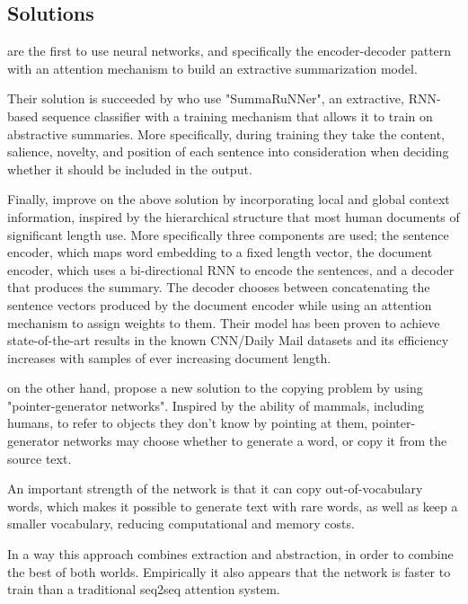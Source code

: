 \documentclass{article}
\begin{document}
	
	\subsection{Solutions}
	
	\cite{lapata} are the first to use neural networks, and specifically the encoder-decoder pattern with an attention mechanism to build an extractive summarization model. 
	
	Their solution is succeeded by \textcite{nallapati} who use "SummaRuNNer", an extractive, RNN-based sequence classifier with a training mechanism that allows it to train on abstractive summaries. More specifically, during training they take the content, salience, novelty, and position of each sentence into consideration when deciding whether it should be included in the output. 
	
	Finally, \textcite{xiao} improve on the above solution by incorporating local and global context information, inspired by the hierarchical structure that most human documents of significant length use. More specifically three components are used; the sentence encoder, which maps word embedding to a fixed length vector, the document encoder, which uses a bi-directional RNN to encode the sentences, and a decoder that produces the summary. The decoder chooses between concatenating the sentence vectors produced by the document encoder while using an attention mechanism to assign weights to them. Their model has been proven to achieve state-of-the-art results in the known CNN/Daily Mail datasets and its efficiency increases with samples of ever increasing document length. \par
	
	\textcite{abigail} on the other hand, propose a new solution to the copying problem by using "pointer-generator networks". Inspired by the ability of mammals, including humans, to refer to objects they don't know by pointing at them, pointer-generator networks may choose whether to generate a word, or copy it from the source text. 
	
	An important strength of the network is that it can copy out-of-vocabulary words, which makes it possible to generate text with rare words, as well as keep a smaller vocabulary, reducing computational and memory costs.
	
	In a way this approach combines extraction and abstraction, in order to combine the best of both worlds. Empirically it also appears that the network is faster to train than a traditional seq2seq attention system. \par
	
\end{document}
